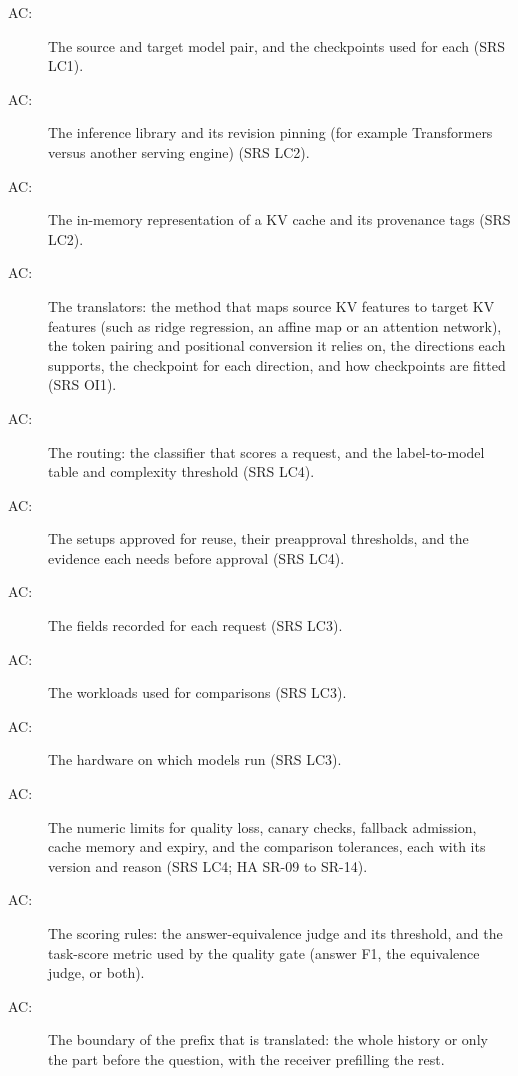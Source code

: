\documentclass[12pt, titlepage]{article}
\newcounter{acnum}
\newcommand{\actheacnum}{AC\theacnum}
\begin{document}
\begin{description}
\item[ \actheacnum \label{acPair}:] The source and target
  model pair, and the checkpoints used for each (SRS LC1).
\item[ \actheacnum \label{acRuntime}:] The inference
  library and its revision pinning (for example Transformers versus another
  serving engine) (SRS LC2).
\item[ \actheacnum \label{acCacheRep}:] The in-memory
  representation of a KV cache and its provenance tags (SRS LC2).
\item[ \actheacnum \label{acMapping}:] The translators:
  the method that maps source KV features to target KV features (such as ridge
  regression, an affine map or an attention network), the token pairing and
  positional conversion it relies on, the directions each supports, the
  checkpoint for each direction, and how checkpoints are fitted (SRS OI1).
\item[ \actheacnum \label{acPolicy}:] The routing: the
  classifier that scores a request, and the label-to-model table and complexity
  threshold (SRS LC4).
\item[ \actheacnum \label{acApprove}:] The setups approved
  for reuse, their preapproval thresholds, and the evidence each needs before
  approval (SRS LC4).
\item[ \actheacnum \label{acLog}:] The fields recorded for
  each request (SRS LC3).
\item[ \actheacnum \label{acWorkload}:] The workloads
  used for comparisons (SRS LC3).
\item[ \actheacnum \label{acHardware}:] The hardware on
  which models run (SRS LC3).
\item[ \actheacnum \label{acLimits}:] The numeric limits
  for quality loss, canary checks, fallback admission, cache memory and expiry,
  and the comparison tolerances, each with its version and reason (SRS LC4;
  HA SR-09 to SR-14).
\item[ \actheacnum \label{acJudge}:] The scoring rules:
  the answer-equivalence judge and its threshold, and the task-score metric used
  by the quality gate (answer F1, the equivalence judge, or both).
\item[ \actheacnum \label{acHandoff}:] The boundary of the
  prefix that is translated: the whole history or only the part before the
  question, with the receiver prefilling the rest.
\end{description}
\end{document}
